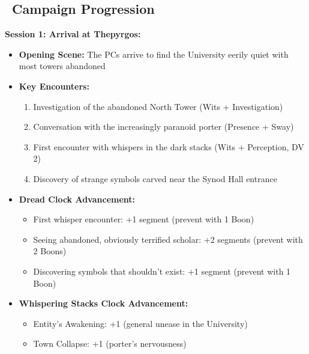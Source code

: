 \documentclass[11pt]{article}
\begin{document}
\subsection*{\faBook\ Campaign Progression}

\textbf{Session 1: Arrival at Thepyrgos:}
\begin{itemize}
    \item \textbf{Opening Scene:} The PCs arrive to find the University eerily quiet with most towers abandoned
    \item \textbf{Key Encounters:}
    \begin{enumerate}
        \item Investigation of the abandoned North Tower (Wits + Investigation)
        \item Conversation with the increasingly paranoid porter (Presence + Sway)
        \item First encounter with whispers in the dark stacks (Wits + Perception, DV 2)
        \item Discovery of strange symbols carved near the Synod Hall entrance
    \end{enumerate}
    \item \textbf{Dread Clock Advancement:}
    \begin{itemize}
        \item First whisper encounter: +1 segment (prevent with 1 Boon)
        \item Seeing abandoned, obviously terrified scholar: +2 segments (prevent with 2 Boons)
        \item Discovering symbols that shouldn't exist: +1 segment (prevent with 1 Boon)
    \end{itemize}
    \item \textbf{Whispering Stacks Clock Advancement:}
    \begin{itemize}
        \item Entity's Awakening: +1 (general unease in the University)
        \item Town Collapse: +1 (porter's nervousness)
    \end{itemize}
\end{itemize}
\end{document}
